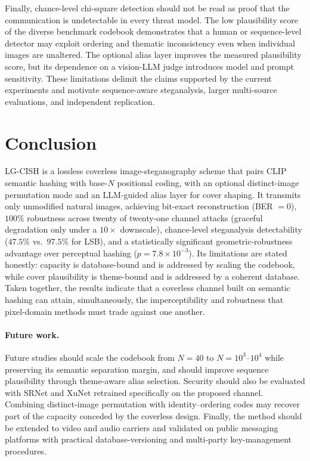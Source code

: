 \documentclass[10pt,a4paper]{article}
\theoremstyle{definition}
\begin{document}
Finally, chance-level chi-square detection should not be read as proof that the
communication is undetectable in every threat model. The low plausibility score of
the diverse benchmark codebook demonstrates that a human or sequence-level detector
may exploit ordering and thematic inconsistency even when individual images are
unaltered. The optional alias layer improves the measured plausibility score, but
its dependence on a vision-LLM judge introduces model and prompt sensitivity. These
limitations delimit the claims supported by the current experiments and motivate
sequence-aware steganalysis, larger multi-source evaluations, and independent
replication.



\section{Conclusion}\label{sec:conclusion}
LG-CISH is a lossless coverless image-steganography scheme that pairs CLIP
semantic hashing with base-$N$ positional coding, with an optional distinct-image
permutation mode and an LLM-guided alias layer for cover shaping. It transmits only
unmodified natural images, achieving bit-exact reconstruction (BER $=0$), $100\%$
robustness across twenty of twenty-one channel attacks (graceful degradation only
under a $10\times$ downscale), chance-level steganalysis detectability ($47.5\%$
vs.\ $97.5\%$ for LSB), and a statistically significant geometric-robustness
advantage over perceptual hashing ($p{=}7.8\times10^{-3}$). Its limitations are
stated honestly: capacity is database-bound and is addressed by scaling the
codebook, while cover plausibility is theme-bound and is addressed by a coherent
database. Taken together, the results indicate that a coverless channel built on
semantic hashing can attain, simultaneously, the imperceptibility and robustness
that pixel-domain methods must trade against one another.

\paragraph{Future work.}\label{sec:future}
Future studies should scale the codebook from $N{=}40$ to
$N{=}10^{3}$--$10^{4}$ while preserving its semantic separation margin, and should
improve sequence plausibility through theme-aware alias selection. Security should
also be evaluated with SRNet and XuNet retrained specifically on the proposed
channel. Combining distinct-image permutation with identity--ordering codes may
recover part of the capacity conceded by the coverless design. Finally, the method
should be extended to video and audio carriers and validated on public messaging
platforms with practical database-versioning and multi-party key-management
procedures.
\end{document}
